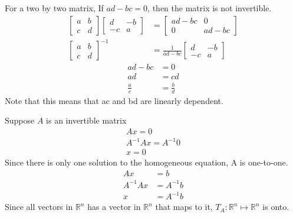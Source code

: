 \documentclass{article}
\theoremstyle{mytheoremstyle}
\theoremstyle{mytheoremstyle}
\theoremstyle{myproblemstyle}
\begin{document}
    For a two by two matrix, If $ad-bc = 0$, then the matrix is not invertible.
    \begin{align*}
        \begin{bmatrix}
            a & b \\
            c & d
        \end{bmatrix}
        \begin{bmatrix}
            d & -b \\
            -c & a
        \end{bmatrix} &=
        \begin{bmatrix}
            ad-bc & 0 \\
            0 & ad-bc
        \end{bmatrix} \\
        \begin{bmatrix}
            a & b \\
            c & d
        \end{bmatrix}^{-1} &=
        \frac{1}{ad-bc} \begin{bmatrix}
            d & -b \\
            -c & a
        \end{bmatrix}
    \end{align*}
    \begin{align*}
        ad-bc&=0 \\
        ad &= cd \\
        \frac{a}{c} &= \frac{b}{d}
    \end{align*}
    Note that this means that ac and bd are linearly dependent.

    Suppose $A$ is an invertible matrix
    \begin{align*}
        Ax=0 \\
        A^{-1}Ax = A^{-1}0 \\
        x = 0
    \end{align*}
    Since there is only one solution to the homogeneous equation, A is
    one-to-one.
    \begin{align*}
        Ax &= b \\
        A^{-1}Ax &= A^{-1}b \\
        x &= A^{-1}b
    \end{align*}
    Since all vectors in $\mathbb{R}^n$ has a vector in $\mathbb{R}^n$ that maps
    to it, $T_{A}: \mathbb{R}^n \mapsto \mathbb{R}^n$ is onto.
\end{document}
